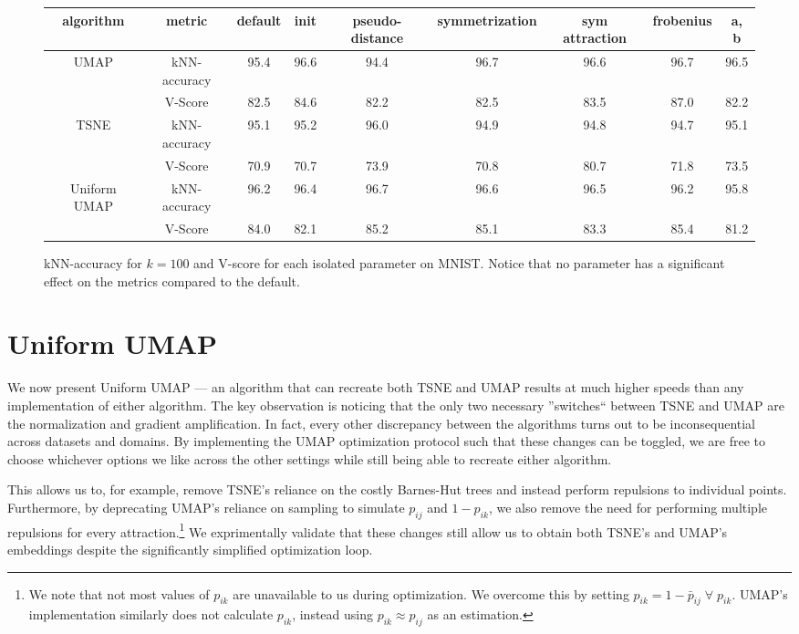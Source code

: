 \documentclass[sigconf, nonacm]{acmart}
\newcommand\ourmethod{Uniform UMAP }
\begin{document}
\begin{figure*}
    \centering
    \begin{tabular}{|c|c|c|c|c|c|c|c|c|}
    \hline
    algorithm & metric & default & init & pseudo-distance & symmetrization & sym attraction & frobenius & a, b \\
    \hline

    \multirow{2}{*}{UMAP} & kNN-accuracy & 95.4 & 96.6 & 94.4 & 96.7 & 96.6 & 96.7 & 96.5 \\ \cline{2-9}
                          & V-Score & 82.5 & 84.6 & 82.2 & 82.5 & 83.5 & 87.0 & 82.2 \\
    \hline

    \multirow{2}{*}{TSNE} & kNN-accuracy & 95.1 & 95.2 & 96.0 & 94.9 & 94.8 & 94.7 & 95.1 \\ \cline{2-9}
                          & V-Score & 70.9 & 70.7 & 73.9 & 70.8 & 80.7 & 71.8 & 73.5 \\
    \hline

    \multirow{2}{*}{\ourmethod} & kNN-accuracy & 96.2 & 96.4 & 96.7 & 96.6 & 96.5 & 96.2 & 95.8 \\ \cline{2-9}
                                & V-Score & 84.0 & 82.1 & 85.2 & 85.1 & 83.3 & 85.4 & 81.2 \\
    \hline
    \end{tabular}
    \caption{kNN-accuracy for $k=100$ and V-score for each isolated parameter on MNIST. Notice that no parameter has a significant effect on the metrics
    compared to the default.}
    \label{irrelevant-metrics}
\end{figure*}

\section{\ourmethod} \label{uniform}
We now present \ourmethod  --- an algorithm that can recreate both TSNE and UMAP results at much higher speeds than any implementation of either algorithm.
The key observation is noticing that the only two necessary ''switches`` between TSNE and UMAP are the normalization and gradient amplification. In fact,
every other discrepancy between the algorithms turns out to be inconsequential across datasets and domains.
By implementing the UMAP optimization protocol such that these changes can be toggled,
we are free to choose whichever options we like across the other settings while still being able to recreate either algorithm.

This allows us to, for example, remove TSNE's reliance on the costly Barnes-Hut trees and instead perform repulsions to individual points.
Furthermore, by deprecating UMAP's reliance on sampling to simulate $p_{ij}$ and $1 - p_{ik}$, we also remove the need for performing multiple repulsions for every
attraction.\footnote{We note that not most values of $p_{ik}$ are unavailable to us during optimization. We overcome this by setting $p_{ik} = 1 - \bar{p}_{ij}
\; \forall \; p_{ik}$. UMAP's implementation similarly does not calculate $p_{ik}$, instead using $p_{ik} \approx p_{ij}$ as an estimation.} We exprimentally
validate that these changes still allow us to obtain both TSNE's and UMAP's embeddings despite the significantly simplified optimization loop.
\end{document}
